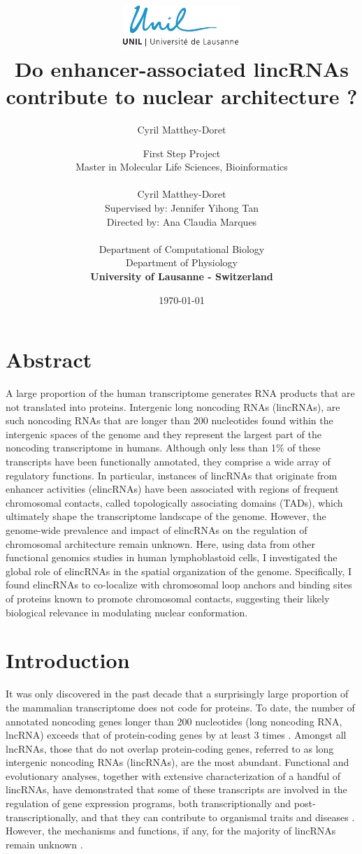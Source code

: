 \documentclass[11pt,a4paper]{report}
\author{Cyril Matthey-Doret}
\title{
\includegraphics[width=1.75in]{lo_unil06_bleu.pdf} \\
\vspace*{1in}
\textbf{Do enhancer-associated lincRNAs contribute to nuclear architecture ?}}
\author{\Large{First Step Project}\\
		Master in Molecular Life Sciences, Bioinformatics\\
				\vspace*{0.5in} \\
		Cyril Matthey-Doret\\
        Supervised by: Jennifer Yihong Tan\\
        Directed by: Ana Claudia Marques\\
		\vspace*{0.5in} \\
		Department of Computational Biology\\
		Department of Physiology\\
        \textbf{University of Lausanne - Switzerland}\\
       } \date{\today}
\begin{document}
\renewcommand{\headrulewidth}{1pt}
\maketitle

\section*{Abstract}

A large proportion of the human transcriptome generates RNA products that are not translated into proteins. Intergenic long noncoding RNAs (lincRNAs), are such noncoding RNAs that are longer than 200 nucleotides found within the intergenic spaces of the genome and they represent the largest part of the noncoding transcriptome in humans. Although only less than 1\% of these transcripts have been functionally annotated, they comprise a wide array of regulatory functions. In particular, instances of lincRNAs that originate from enhancer activities (elincRNAs) have been associated with regions of frequent chromosomal contacts, called topologically associating domains (TADs), which ultimately shape the transcriptome landscape of the genome. However, the genome-wide prevalence and impact of elincRNAs on the regulation of chromosomal architecture remain unknown. Here, using data from other functional genomics studies in human lymphoblastoid cells, I investigated the global role of elincRNAs in the spatial organization of the genome. Specifically, I found elincRNAs to co-localize with chromosomal loop anchors and binding sites of proteins known to promote chromosomal contacts, suggesting their likely biological relevance in modulating nuclear conformation.

\section*{Introduction}
It was only discovered in the past decade that a surprisingly large proportion of the mammalian transcriptome does not code for proteins. To date, the number of annotated noncoding genes longer than 200 nucleotides (long noncoding RNA, lncRNA) exceeds that of protein-coding genes by at least 3 times \cite{Iyer2015}⁠. Amongst all lncRNAs, those that do not overlap protein-coding genes, referred to as long intergenic noncoding RNAs (lincRNAs), are the most abundant. Functional and evolutionary analyses, together with extensive characterization of a handful of lincRNAs, have demonstrated that some of these transcripts are involved in the regulation of gene expression programs, both transcriptionally and post-transcriptionally, and that they can contribute to organismal traits and diseases \cite{Kornienko2013}⁠. However, the mechanisms and functions, if any, for the majority of lincRNAs remain unknown \cite{Rinn2012}⁠.  
\end{document}
